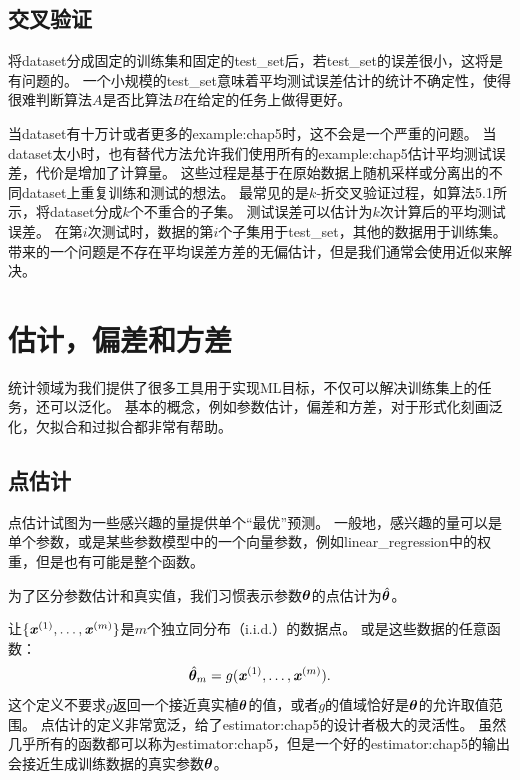 \subsection{交叉验证}
\label{sec:cross_validation}
将\gls{dataset}分成固定的训练集和固定的\gls{test_set}后，若\gls{test_set}的误差很小，这将是有问题的。
一个小规模的\gls{test_set}意味着平均测试误差估计的统计不确定性，使得很难判断算法$A$是否比算法$B$在给定的任务上做得更好。


当\gls{dataset}有十万计或者更多的\gls{example:chap5}时，这不会是一个严重的问题。
当\gls{dataset}太小时，也有替代方法允许我们使用所有的\gls{example:chap5}估计平均测试误差，代价是增加了计算量。
这些过程是基于在原始数据上随机采样或分离出的不同\gls{dataset}上重复训练和测试的想法。
最常见的是$k$-折交叉验证过程，如算法5.1所示，将\gls{dataset}分成$k$个不重合的子集。
测试误差可以估计为$k$次计算后的平均测试误差。
在第$i$次测试时，数据的第$i$个子集用于\gls{test_set}，其他的数据用于训练集。
带来的一个问题是不存在平均误差方差的无偏估计\citep{Bengio-Grandvalet-JMLR-04}，但是我们通常会使用近似来解决。

\section{估计，偏差和方差}
\label{sec:estimators_bias_and_variance}
统计领域为我们提供了很多工具用于实现\gls{ML}目标，不仅可以解决训练集上的任务，还可以泛化。
基本的概念，例如参数估计，偏差和方差，对于形式化刻画泛化，欠拟合和过拟合都非常有帮助。

\subsection{点估计}
\label{sec:point_estimation}
点估计试图为一些感兴趣的量提供单个``最优''预测。
一般地，感兴趣的量可以是单个参数，或是某些参数模型中的一个向量参数，例如\gls{linear_regression}中的权重，但是也有可能是整个函数。

为了区分参数估计和真实值，我们习惯表示参数$\boldsymbol{\theta}$的点估计为$\hat{\boldsymbol{\theta}}$。

让$\{\boldsymbol{\mathit{x}}^{(1)},\dots,\boldsymbol{\mathit{x}}^{(m)}\}$是$m$个独立同分布（i.i.d.）的数据点。
或是这些数据的任意函数：
\begin{equation}
    \hat{\boldsymbol{\theta}}_m = g(\boldsymbol{\mathit{x}}^{(1)}, \dots, \boldsymbol{\mathit{x}}^{(m)}) .
\end{equation}
这个定义不要求$g$返回一个接近真实植$\boldsymbol{\theta}$的值，或者$g$的值域恰好是$\boldsymbol{\theta}$的允许取值范围。
点估计的定义非常宽泛，给了\gls{estimator:chap5}的设计者极大的灵活性。
虽然几乎所有的函数都可以称为\gls{estimator:chap5}，但是一个好的\gls{estimator:chap5}的输出会接近生成训练数据的真实参数$\boldsymbol{\theta}$。

